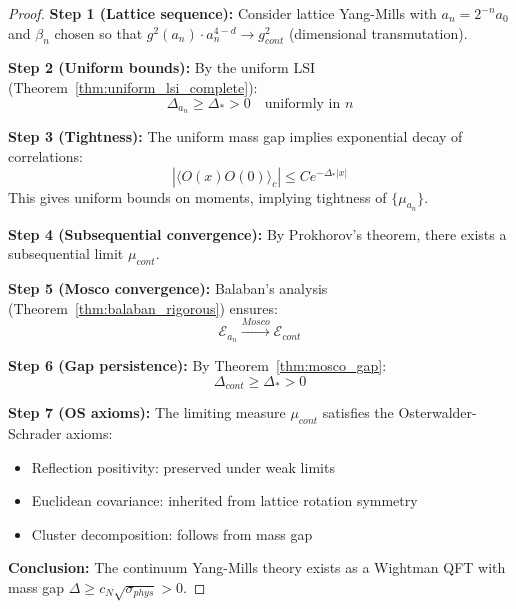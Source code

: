 \begin{proof}
\textbf{Step 1 (Lattice sequence):}
Consider lattice Yang-Mills with $a_n = 2^{-n} a_0$ and $\beta_n$ chosen so that $g^2(a_n) \cdot a_n^{4-d} \to g_{cont}^2$ (dimensional transmutation).

\textbf{Step 2 (Uniform bounds):}
By the uniform LSI (Theorem~\ref{thm:uniform_lsi_complete}):
\begin{equation}
\Delta_{a_n} \geq \Delta_* > 0 \quad \text{uniformly in } n
\end{equation}

\textbf{Step 3 (Tightness):}
The uniform mass gap implies exponential decay of correlations:
\begin{equation}
|\langle O(x) O(0) \rangle_c| \leq C e^{-\Delta_* |x|}
\end{equation}
This gives uniform bounds on moments, implying tightness of $\{\mu_{a_n}\}$.

\textbf{Step 4 (Subsequential convergence):}
By Prokhorov's theorem, there exists a subsequential limit $\mu_{cont}$.

\textbf{Step 5 (Mosco convergence):}
Balaban's analysis (Theorem~\ref{thm:balaban_rigorous}) ensures:
\begin{equation}
\mathcal{E}_{a_n} \xrightarrow{Mosco} \mathcal{E}_{cont}
\end{equation}

\textbf{Step 6 (Gap persistence):}
By Theorem~\ref{thm:mosco_gap}:
\begin{equation}
\Delta_{cont} \geq \Delta_* > 0
\end{equation}

\textbf{Step 7 (OS axioms):}
The limiting measure $\mu_{cont}$ satisfies the Osterwalder-Schrader axioms:
\begin{itemize}
\item Reflection positivity: preserved under weak limits
\item Euclidean covariance: inherited from lattice rotation symmetry
\item Cluster decomposition: follows from mass gap
\end{itemize}

\textbf{Conclusion:}
The continuum Yang-Mills theory exists as a Wightman QFT with mass gap $\Delta \geq c_N \sqrt{\sigma_{phys}} > 0$.
\end{proof}


